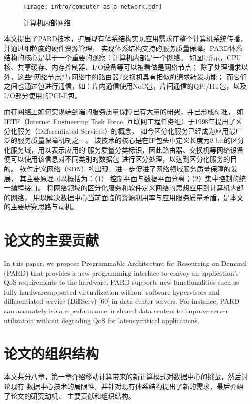 \begin{figure}[H]
  \centering
  \texttt{[image: intro/computer-as-a-network.pdf]}
  \caption{计算机内部网络}
  \label{fig:computer-as-a-network}
\end{figure}

本文提出了PARD\cite{pard2015}技术，扩展现有体系结构实现应用需求在整个计算机系统传播，并通过细粒度的硬件资源管理，
实现体系结构支持的服务质量保障。PARD体系结构的核心是基于一个重要的观察：计算机内部是一个网络。
如图\ref{fig:computer-as-a-network}所示，CPU核、共享缓存、内存控制器、I/O设备等可以被看做是网络节点；
除了处理请求以外，这些“网络节点”与网络中的路由器/交换机具有相似的请求转发功能；
而它们之间也通过包进行通信，如：片内通信使用NoC包，片间通信的QPI/HT包，以及I/O部分使用的PCI-E包。

而在网络上如何实现端到端的服务质量保障已有大量的研究，并已形成标准，
如IETF（Internet Engineering Task Force, 互联网工程任务组）于1998年提出了区分化服务（Differentiated Services）的概念，
如今区分化服务已经成为应用最广泛的服务质量保障机制之一。
该技术的核心是在IP包头中定义长度为8-bit的区分化服务域，用以表示应用的
服务质量分类标识，因此路由器、交换机等网络设备便可以使用该信息对不同类别的数据包
进行区分处理，以达到区分化服务的目的。
软件定义网络（SDN）的出现，进一步促进了网络领域服务质量保障的发展，
其主要原理可以概括为：（1） 控制平面与数据平面分离；（2）集中控制的统一编程接口。
将网络领域的区分化服务和软件定义网络的思想应用到计算机内部的网络，
用以解决数据中心当前面临的资源利用率与应用服务质量矛盾，是本文的主要研究思路与动机。

\section{论文的主要贡献}
In this paper, we propose Programmable Architecture for
Resourcing-on-Demand (PARD) that provides a new programming
interface to convey an application’s QoS requirements to the hardware.
PARD supports new functionalities such as fully hardwaresupported
virtualization without software hypervisors and differentiated
service (DiffServ) [60] in data center servers. For instance,
PARD can accurately isolate performance in shared data centers
to improve server utilization without degrading QoS for latencycritical
applications.


\section{论文的组织结构}

本文共分八章，第一章介绍移动计算带来的新计算模式对数据中心的挑战，然后讨论现有
数据中心技术的局限性，并针对现有体系结构提出了新的需求，最后介绍了论文的研究动机、
主要贡献和组织结构。

